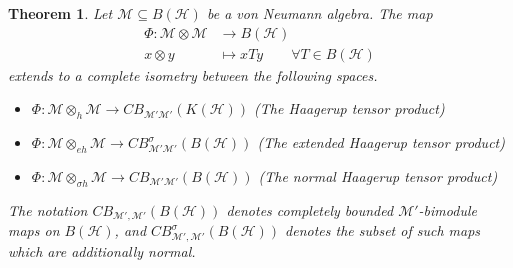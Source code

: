 \documentclass[12pt]{article}
\newtheorem{theorem}{Theorem}[section]
\theoremstyle{definition}
\newcommand{\mc}[1]{\mathcal{#1}}
\newcommand{\<}{\langle}
\renewcommand{\>}{\rangle}
\renewcommand{\subset}{\subseteq}
\begin{document}
\begin{theorem} \label{thm: m-haagerups}
    Let $\mc M \subset B(\mc H)$ be a von Neumann algebra. The map
    \begin{align*}
    \Phi : \mc M \otimes \mc M &\to B(\mc H) \\
    x \otimes y &\mapsto xTy \qquad \forall T \in B(\mc H)
    \end{align*}
    extends to a complete isometry between the following spaces.
    \begin{itemize}
        \item $\Phi: \mc M \otimes_h \mc M \to CB_{\mc M' \mc M'} (K(\mc H))$ (The Haagerup tensor product) 
        \item $\Phi: \mc M \otimes_{eh} \mc M  \to CB^\sigma_{\mc M' \mc M'}(B(\mc H))$ (The extended Haagerup tensor product)  
        \item $\Phi: \mc M \otimes_{\sigma h} \mc M \to CB_{\mc M' \mc M'}(B(\mc H))$ (The normal Haagerup tensor product) 
    \end{itemize}
    The notation $CB_{\mc M',\mc M'}(B(\mc H))$ denotes completely bounded $\mc M'$-bimodule maps on $B(\mc H)$, and $CB_{\mc M',\mc M'}^\sigma(B(\mc H))$ denotes the subset of such maps which are additionally normal.
\end{theorem}
\end{document}
